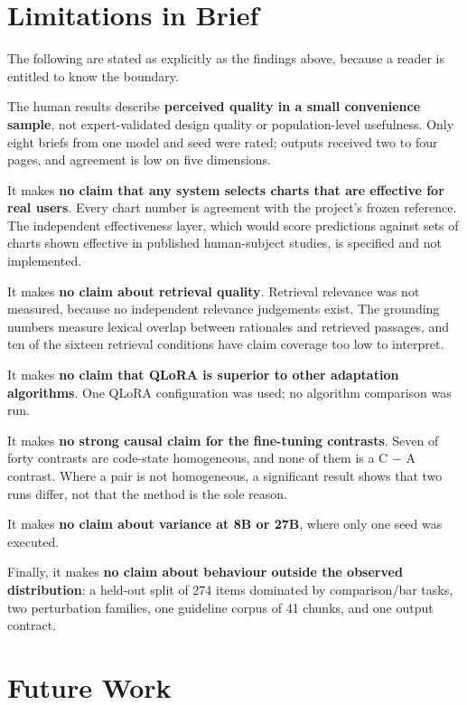 \section{Limitations in Brief}

The following are stated as explicitly as the findings above, because a reader is entitled to know the boundary.

The human results describe \textbf{perceived quality in a small convenience sample}, not expert-validated design quality or population-level usefulness. Only eight briefs from one model and seed were rated; outputs received two to four pages, and agreement is low on five dimensions.

It makes \textbf{no claim that any system selects charts that are effective for real users}. Every chart number is agreement with the project's frozen reference. The independent effectiveness layer, which would score predictions against sets of charts shown effective in published human-subject studies, is specified and not implemented.

It makes \textbf{no claim about retrieval quality}. Retrieval relevance was not measured, because no independent relevance judgements exist. The grounding numbers measure lexical overlap between rationales and retrieved passages, and ten of the sixteen retrieval conditions have claim coverage too low to interpret.

It makes \textbf{no claim that QLoRA is superior to other adaptation algorithms}. One QLoRA configuration was used; no algorithm comparison was run.

It makes \textbf{no strong causal claim for the fine-tuning contrasts}. Seven of forty contrasts are code-state homogeneous, and none of them is a C \ensuremath{-} A contrast. Where a pair is not homogeneous, a significant result shows that two runs differ, not that the method is the sole reason.

It makes \textbf{no claim about variance at 8B or 27B}, where only one seed was executed.

Finally, it makes \textbf{no claim about behaviour outside the observed distribution}: a held-out split of 274 items dominated by comparison/bar tasks, two perturbation families, one guideline corpus of 41 chunks, and one output contract.

\section{Future Work}

